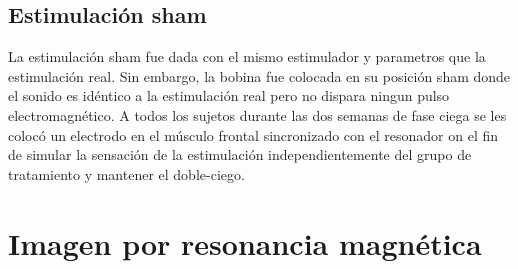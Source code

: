 \subsection{Estimulación sham}
La estimulación sham fue dada con el mismo estimulador y parametros que la estimulación real. Sin embargo, la bobina fue colocada en su posición sham donde el sonido es idéntico a la estimulación real pero no dispara ningun pulso electromagnético.
A todos los sujetos durante las dos semanas de fase ciega se les colocó un electrodo en el músculo frontal sincronizado con el resonador on el fin de simular la sensación de la estimulación independientemente del grupo de tratamiento y mantener el doble-ciego.

\section{Imagen por resonancia magnética}
